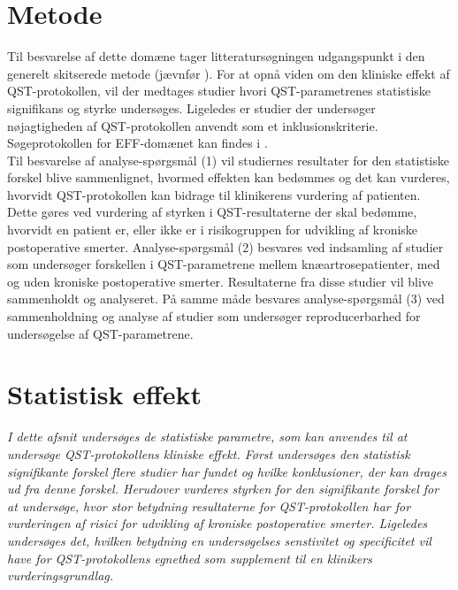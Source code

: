 \section{Metode}
Til besvarelse af dette domæne tager litteratursøgningen udgangspunkt i den generelt skitserede metode (jævnfør ). For at opnå viden om den kliniske effekt af QST-protokollen, vil der medtages studier hvori QST-parametrenes statistiske signifikans og styrke undersøges. Ligeledes er studier der undersøger nøjagtigheden af QST-protokollen anvendt som et inklusionskriterie. Søgeprotokollen for EFF-domænet kan findes i . \\ 
Til besvarelse af analyse-spørgsmål (1) vil studiernes resultater for den statistiske forskel blive sammenlignet, hvormed effekten kan bedømmes og det kan vurderes, hvorvidt QST-protokollen kan bidrage til klinikerens vurdering af patienten. Dette gøres ved vurdering af styrken i QST-resultaterne der skal bedømme, hvorvidt en patient er, eller ikke er i risikogruppen for udvikling af kroniske postoperative smerter. Analyse-spørgsmål (2) besvares ved indsamling af studier som undersøger forskellen i QST-parametrene mellem knæartrosepatienter, med og uden kroniske postoperative smerter. Resultaterne fra disse studier vil blive sammenholdt og analyseret. På samme måde besvares analyse-spørgsmål (3) ved sammenholdning og analyse af studier som undersøger reproducerbarhed for undersøgelse af QST-parametrene.

\section{Statistisk effekt}
\textit{I dette afsnit undersøges de statistiske parametre, som kan anvendes til at undersøge QST-protokollens kliniske effekt. Først undersøges den statistisk signifikante forskel flere studier har fundet og hvilke konklusioner, der kan drages ud fra denne forskel. Herudover vurderes styrken for den signifikante forskel for at undersøge, hvor stor betydning resultaterne for QST-protokollen har for vurderingen af risici for udvikling af kroniske postoperative smerter. Ligeledes undersøges det, hvilken betydning en undersøgelses senstivitet og specificitet vil have for QST-protokollens egnethed som supplement til en klinikers vurderingsgrundlag.}

